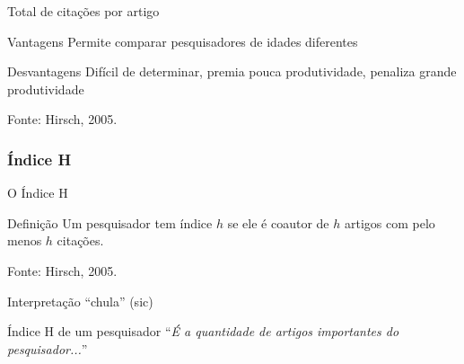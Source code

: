 \documentclass{beamer}
\begin{document}
\begin{frame}{Total de citações por artigo}
  \begin{block}{Vantagens}
    Permite comparar pesquisadores de idades diferentes
  \end{block}
  \bigskip
  \begin{block}{Desvantagens}
    Difícil de determinar, premia pouca produtividade, penaliza grande produtividade
  \end{block}

  \vfill
  \footnotesize
  \hfill Fonte: Hirsch, 2005.
\end{frame}

\subsubsection{Índice H}

\begin{frame}{O Índice H}
  \begin{block}{Definição}
    Um pesquisador tem índice $h$ se ele é coautor de $h$ artigos com \alert{pelo menos} $h$ citações.
  \end{block}



  \vfill
  \footnotesize
  \hfill Fonte: Hirsch, 2005.
\end{frame}

\begin{frame}{Interpretação ``chula'' (sic)}
  \begin{block}{Índice H de um pesquisador}
    ``{\em É a quantidade de artigos importantes do pesquisador...}''
  \end{block}
\end{frame}
\end{document}
